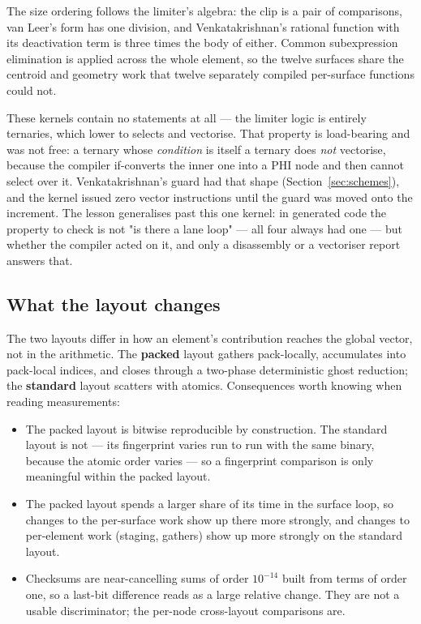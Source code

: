 The size ordering follows the limiter's algebra: the clip is a pair of comparisons, van Leer's
form has one division, and Venkatakrishnan's rational function with its deactivation term is three
times the body of either. Common subexpression elimination is applied across the whole element, so
the twelve surfaces share the centroid and geometry work that twelve separately compiled
per-surface functions could not.

These kernels contain no  statements at all --- the limiter logic is entirely ternaries,
which lower to selects and vectorise. That property is load-bearing and was not free: a ternary
whose \emph{condition} is itself a ternary does \emph{not} vectorise, because the compiler
if-converts the inner one into a PHI node and then cannot select over it. Venkatakrishnan's guard
had that shape (Section~\ref{sec:schemes}), and the kernel issued zero vector instructions until
the guard was moved onto the increment. The lesson generalises past this one kernel: in generated
code the property to check is not "is there a lane loop" --- all four always had one --- but
whether the compiler acted on it, and only a disassembly or a vectoriser report answers that.

\subsection{What the layout changes}

The two layouts differ in how an element's contribution reaches the global vector, not in the
arithmetic. The \textbf{packed} layout gathers pack-locally, accumulates into pack-local
indices, and closes through a two-phase deterministic ghost reduction; the \textbf{standard}
layout scatters with atomics. Consequences worth knowing when reading measurements:

\begin{itemize}
\item The packed layout is bitwise reproducible by construction. The standard layout is not ---
      its fingerprint varies run to run with the same binary, because the atomic order varies ---
      so a fingerprint comparison is only meaningful within the packed layout.
\item The packed layout spends a larger share of its time in the surface loop, so changes to the
      per-surface work show up there more strongly, and changes to per-element work (staging,
      gathers) show up more strongly on the standard layout.
\item Checksums are near-cancelling sums of order $10^{-14}$ built from terms of order one, so a
      last-bit difference reads as a large relative change. They are not a usable discriminator;
      the per-node cross-layout comparisons are.
\end{itemize}
